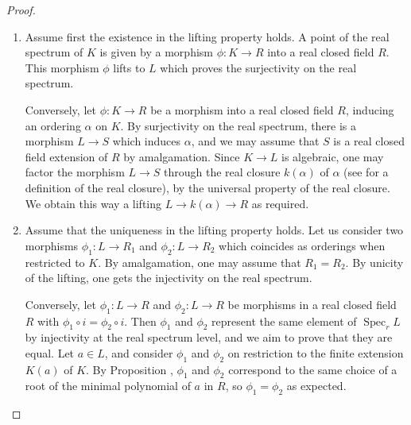 \documentclass[12pt]{amsart}
\theoremstyle{definition}
\DeclareMathOperator{\Sp}{Spec}
\begin{document}
\begin{proof}\begin{enumerate}
\item 
Assume first the existence in the lifting property holds.
A point of the real spectrum of $K$ is given by a morphism $\phi : K\to R$ into a real closed field $R$. This morphism $\phi$ lifts to $L$ which proves the surjectivity on the real spectrum.

Conversely, let $\phi:K\to R$ be a morphism into a real closed field $R$, inducing an ordering $\alpha$ on $K$. 
By surjectivity on the real spectrum, there is a morphism $L\to S$ which induces  $\alpha$, and we may assume that $S$ is a real closed field extension of $R$ by amalgamation.
Since $K\to L$ is algebraic, one may factor the morphism $L\to S$ through  the real closure $k(\alpha)$ of $\alpha$ (see \cite{BCR} for a definition of the real closure), by the universal property of the real closure. We obtain this way a lifting $L\to k(\alpha) \to R$ as required. 

\item Assume that the uniqueness in the lifting property holds. Let us consider two morphisms 
$\phi_1:L\to R_1$ and $\phi_2:L\to R_2$ which coincides as orderings when restricted to $K$.
By amalgamation, one may assume that $R_1=R_2$. By unicity of the lifting, one gets the injectivity on the real spectrum.

Conversely, let $\phi_1:L\to R$ and  $\phi_2:L\to R$ be morphisms in a real closed field $R$ with $\phi_1\circ i=\phi_2 \circ i$. Then  $\phi_1$ and $\phi_2$ represent the same element of $\Sp_r L$ by injectivity at the real spectrum level, and we aim to prove that they are equal. Let $a\in L$, and consider $\phi_1$ and $\phi_2$ on restriction to the finite extension $K(a)$ of $K$. 
By Proposition \cite[Prop 1.3.7]{BCR}, 
$\phi_1$ and $\phi_2$ correspond to the same choice of a root of the minimal polynomial of $a$ in $R$, so $\phi_1=\phi_2$ as expected.
\end{enumerate}
\end{proof}
\end{document}

